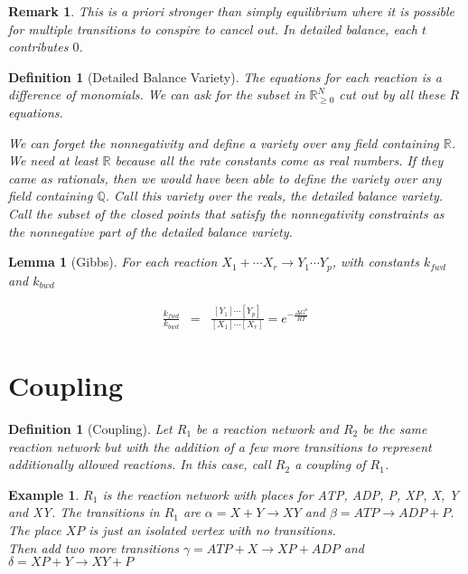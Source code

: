 \documentclass[11pt]{book}
\theoremstyle{change}
\newtheorem{definition}[equation]{Definition}
\newtheorem{lemma}[equation]{Lemma}
\newtheorem{example}[equation]{Example}
\newtheorem{remark}[equation]{Remark}
\theoremstyle{nonumberplain}
\numberwithin{equation}{section}
\begin{document}
\begin{remark}
This is a priori stronger than simply equilibrium where it is possible for multiple transitions to conspire to cancel out. In detailed balance, each $t$ contributes $0$.
\end{remark}

\begin{definition}[Detailed Balance Variety]

The equations for each reaction is a difference of monomials. We can ask for the subset in $\mathbb{R}_{\geq 0}^N$ cut out by all these $R$ equations.

We can forget the nonnegativity and define a variety over any field containing $\mathbb{R}$. We need at least $\mathbb{R}$ because all the rate constants come as real numbers. If they came as rationals, then we would have been able to define the variety over any field containing $\mathbb{Q}$. Call this variety over the reals, the detailed balance variety. Call the subset of the closed points that satisfy the nonnegativity constraints as the nonnegative part of the detailed balance variety.
\end{definition}

\begin{lemma}[Gibbs]
For each reaction $X_1 + \cdots X_r \to Y_1 \cdots Y_p$, with constants $k_{fwd}$ and $k_{bwd}$

\begin{eqnarray*}
\frac{k_{fwd}}{k_{bwd}} &=& \frac{ [Y_1] \cdots [Y_p] }{[X_1] \cdots [X_r]} = e^{- \frac{\Delta G^o}{RT}}
\end{eqnarray*}
\end{lemma}

\section{Coupling}

\begin{definition}[Coupling]
Let $R_1$ be a reaction network and $R_2$ be the same reaction network but with the addition of a few more transitions to represent additionally allowed reactions. In this case, call $R_2$ a coupling of $R_1$.
\end{definition}

\begin{example}
$R_1$ is the reaction network with places for ATP, ADP, P, XP, X, Y and XY. The transitions in $R_1$ are $\alpha = X + Y \to XY$ and $\beta = ATP \to ADP + P$. The place $XP$ is just an isolated vertex with no transitions.\\

Then add two more transitions $\gamma = ATP + X \to XP + ADP$ and $\delta = XP + Y \to XY + P$
\end{example}
\end{document}
